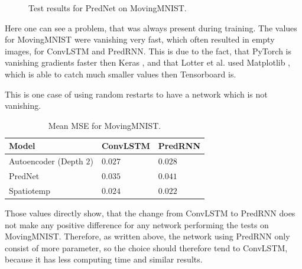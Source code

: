    \begin{figure}[H]
   \centering
   \qquad
   \qquad
   \caption{Test results for PredNet on MovingMNIST.}
   \label{figure::prednet_mnist_results}
  \end{figure}\noindent
  Here one can see a problem, that was always present during training. The values for MovingMNIST were vanishing very fast, which often resulted in empty images,
  for ConvLSTM and PredRNN. This is due to the fact, that PyTorch is vanishing gradients faster then Keras \cite{chollet2015}, and that Lotter et al. used 
  Matplotlib \cite{Hunter2007}, which is able to catch much smaller values then Tensorboard is.
    
  This is one case of using random restarts to have a network which is not vanishing.
   \begin{table}[H]
    \begin{center}
     \begin{tabular}{| l | l | l |}\hline
      \textbf{Model} & \textbf{ConvLSTM} & \textbf{PredRNN} \\\hline
      Autoencoder (Depth $2$) & $0.027$ & $0.028$ \\\hline
      PredNet & $0.035$ & $0.041$ \\\hline
      Spatiotemp & $0.024$ & $0.022$ \\\hline
     \end{tabular}
    \end{center}
    \caption{Mean MSE for MovingMNIST.}
   \end{table}\noindent
   Those values directly show, that the change from ConvLSTM to PredRNN does not make any positive difference for any network performing the tests on MovingMNIST.
   Therefore, as written above, the network using PredRNN only consist of more parameter, so the choice should therefore tend to ConvLSTM, because it has less
   computing time and similar results.
   
